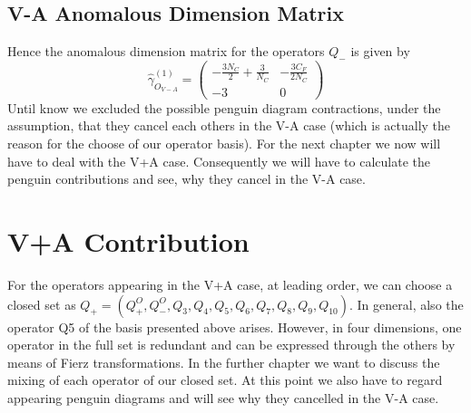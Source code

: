 	\subsection{V-A Anomalous Dimension Matrix}
	Hence the anomalous dimension matrix for the operators $Q_-$ is given by
	\begin{equation}
		\label{eq:anomalousDimensionMatrixVmA}
		\hat \gamma^{(1)}_{O_{V-A}} = 
		\begin{pmatrix}
			-\frac{3N_C}{2}+\frac{3}{N_C} & -\frac{3C_F}{2N_C} \\
			-3 & 0
		\end{pmatrix}
	\end{equation}
	Until know we excluded the possible penguin diagram contractions, under the assumption, that they cancel each others in the V-A case (which is actually the reason for the choose of our operator basis). For the next chapter we now will have to deal with the V+A case. Consequently we will have to calculate the penguin contributions and see, why they cancel in the V-A case.
			
	\section{V+A Contribution}
	For the operators appearing in the V+A case, at leading order, we can choose a closed set as $Q_+ = (Q^O_+, Q^O_-, Q_3, Q_4, Q_5, Q_6, Q_7, Q_8, Q_9, Q_{10})$. In general, also the operator Q5 of the basis presented above arises. However, in four dimensions, one operator in the full set is redundant and can be expressed through the others by means of Fierz transformations. In the further chapter we want to discuss the mixing of each operator of our closed set. At this point we also have to regard appearing penguin diagrams and will see why they cancelled in the V-A case. 

